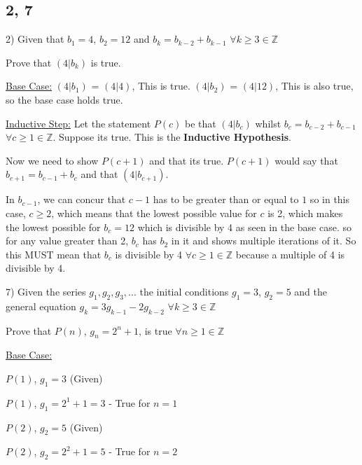 \documentclass[11pt]{article}
\newcommand*{\mybox}[1]{\framebox{#1}}
\begin{document}
\begin{flushleft}
\subsection{2, 7}

2) Given that $b_1 = 4$, $b_2 = 12$ and $b_k = b_{k-2} + b_{k-1}$ $\forall k\geq 3 \in \mathbb{Z}$

Prove that $(4|b_k)$ is true.

\vspace{3mm}

\underline{Base Case:} $(4|b_1)$ = $(4|4)$, This is true. $(4|b_2)$ = $(4|12)$, This is also true, so the base case holds true.

\vspace{3mm}

\underline{Inductive Step:} Let the statement $P(c)$ be that $(4|b_c)$ whilst $b_c = b_{c-2}+b_{c-1}$ $\forall c \geq 1 \in \mathbb{Z}$. Suppose its true. This is the \textbf{Inductive Hypothesis}.

\vspace{3mm}
Now we need to show $P(c+1)$ and that its true. $P(c+1)$ would say that $b_{c+1} = b_{c-1}+b_{c}$ and that $(4|b_{c+1})$.

In $b_{c-1}$, we can concur that $c-1$ has to be greater than or equal to $1$ so in this case, $c\geq 2$, which means that the lowest possible value for $c$ is 2, which makes the lowest possible for $b_c = 12$ which is divisible by 4 as seen in the base case. so for any value greater than 2, $b_c$ has $b_2$ in it and shows multiple iterations of it. So this MUST mean that $b_c$ is divisible by 4 $\forall c \geq 1 \in \mathbb{Z}$ because a multiple of 4 is divisible by 4. \mybox{QED}

\hrulefill

7) Given the series $g_1, g_2, g_3,...$ the initial conditions $g_1 = 3$, $g_2 = 5$ and the general equation $g_k = 3g_{k-1}-2g_{k-2}$ $\forall k\geq3 \in \mathbb{Z}$

Prove that $P(n)$, $g_n = 2^n + 1$, is true $\forall n \geq 1 \in \mathbb{Z}$

\vspace{3mm}

\underline{Base Case:} 

$P(1)$, $g_1 = 3$ (Given) 

$P(1)$, $g_1 = 2^1 + 1 = 3$ - True for $n = 1$

$P(2)$, $g_2 = 5$ (Given) 

$P(2)$, $g_2 = 2^2 + 1 = 5$ - True for $n = 2$


\end{flushleft}
\end{document}
